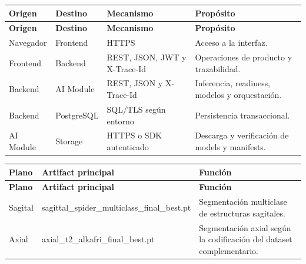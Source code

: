 {\footnotesize
\setlength{\LTleft}{0pt}
\setlength{\LTright}{0pt}
\setlength{\tabcolsep}{2pt}
\renewcommand{\arraystretch}{1.18}
\label{tab:arch-red-seguridad}
\begin{longtable}{>{\raggedright\arraybackslash}p{} >{\raggedright\arraybackslash}p{} >{\raggedright\arraybackslash}p{} >{\raggedright\arraybackslash}p{}}
\hline
\textbf{Origen} & \textbf{Destino} & \textbf{Mecanismo} & \textbf{Propósito} \\
\hline
\endfirsthead
\hline
\textbf{Origen} & \textbf{Destino} & \textbf{Mecanismo} & \textbf{Propósito} \\
\hline
\endhead
\hline
\endfoot
Navegador & Frontend & HTTPS & Acceso a la interfaz. \\
Frontend & Backend & REST, JSON, JWT y X-Trace-Id & Operaciones de producto y trazabilidad. \\
Backend & AI Module & REST, JSON y X-Trace-Id & Inferencia, readiness, modelos y orquestación. \\
Backend & PostgreSQL & SQL/TLS según entorno & Persistencia transaccional. \\
AI Module & Storage & HTTPS o SDK autenticado & Descarga y verificación de models y manifests. \\
\hline
\end{longtable}
}

{\footnotesize
\setlength{\LTleft}{0pt}
\setlength{\LTright}{0pt}
\setlength{\tabcolsep}{2pt}
\renewcommand{\arraystretch}{1.18}
\label{tab:arch-artifacts-modelos}
\begin{longtable}{>{\raggedright\arraybackslash}p{} >{\raggedright\arraybackslash}p{} >{\raggedright\arraybackslash}p{}}
\hline
\textbf{Plano} & \textbf{Artifact principal} & \textbf{Función} \\
\hline
\endfirsthead
\hline
\textbf{Plano} & \textbf{Artifact principal} & \textbf{Función} \\
\hline
\endhead
\hline
\endfoot
Sagital & sagittal\_spider\_multiclass\_final\_best.pt & Segmentación multiclase de estructuras sagitales. \\
Axial & axial\_t2\_alkafri\_final\_best.pt & Segmentación axial según la codificación del dataset complementario. \\
\hline
\end{longtable}
}

